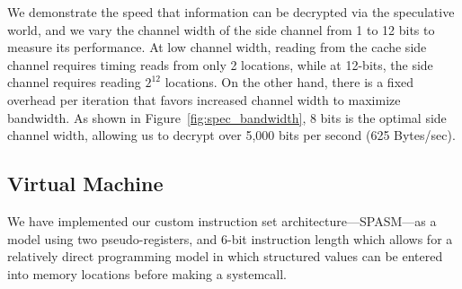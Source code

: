 We demonstrate the speed that information can be decrypted via the speculative
world, and we vary the channel width of the side channel from 1 to 12 bits to
measure its performance. At low channel width, reading from the cache side
channel requires timing reads from only 2 locations, while at 12-bits, the side
channel requires reading $2^{12}$ locations. On the other hand, there is a fixed
overhead per iteration that favors increased channel width to maximize
bandwidth. As shown in Figure~\ref{fig:spec_bandwidth}, 8 bits is the optimal
side channel width, allowing us to decrypt over 5,000 bits per second (625
Bytes/sec).



\FigSpecBandwidth

\subsection{Virtual Machine}
\label{subsec:spasm}


We have implemented our custom instruction set architecture---SPASM---as a model
using two pseudo-registers, and
6-bit instruction length which allows for a relatively direct programming model
in which structured values can be entered into memory locations before making
a systemcall.


%

